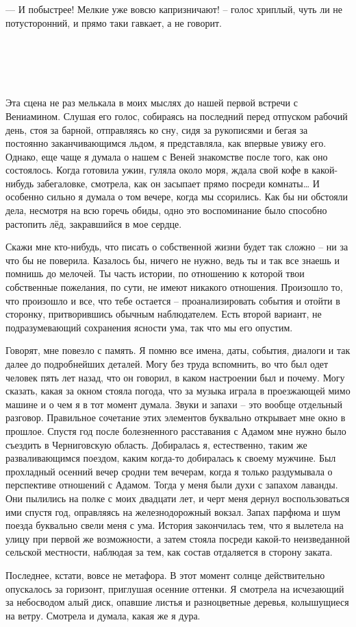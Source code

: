 \documentclass[
]{book}
\begin{document}
--- И побыстрее! Мелкие уже вовсю капризничают! -- голос хриплый, чуть ли не потусторонний, и прямо таки гавкает, а не говорит.

\hypertarget{section-3}{%
\chapter{~}\label{section-3}}

Эта сцена не раз мелькала в моих мыслях до нашей первой встречи с Вениамином. Слушая его голос, собираясь на последний перед отпуском рабочий день, стоя за барной, отправляясь ко сну, сидя за рукописями и бегая за постоянно заканчивающимся льдом, я представляла, как впервые увижу его. Однако, еще чаще я думала о нашем с Веней знакомстве после того, как оно состоялось. Когда готовила ужин, гуляла около моря, ждала свой кофе в какой-нибудь забегаловке, смотрела, как он засыпает прямо посреди комнаты\ldots{} И особенно сильно я думала о том вечере, когда мы ссорились. Как бы ни обстояли дела, несмотря на всю горечь обиды, одно это воспоминание было способно растопить лёд, закравшийся в мое сердце.

Скажи мне кто-нибудь, что писать о собственной жизни будет так сложно -- ни за что бы не поверила. Казалось бы, ничего не нужно, ведь ты и так все знаешь и помнишь до мелочей. Ты часть истории, по отношению к которой твои собственные пожелания, по сути, не имеют никакого отношения. Произошло то, что произошло и все, что тебе остается -- проанализировать события и отойти в сторонку, притворившись обычным наблюдателем. Есть второй вариант, не подразумевающий сохранения ясности ума, так что мы его опустим.

Говорят, мне повезло с память. Я помню все имена, даты, события, диалоги и так далее до подробнейших деталей. Могу без труда вспомнить, во что был одет человек пять лет назад, что он говорил, в каком настроении был и почему. Могу сказать, какая за окном стояла погода, что за музыка играла в проезжающей мимо машине и о чем я в тот момент думала. Звуки и запахи -- это вообще отдельный разговор. Правильное сочетание этих элементов буквально открывает мне окно в прошлое. Спустя год после болезненного расставания с Адамом мне нужно было съездить в Черниговскую область. Добиралась я, естественно, таким же разваливающимся поездом, каким когда-то добиралась к своему мужчине. Был прохладный осенний вечер сродни тем вечерам, когда я только раздумывала о перспективе отношений с Адамом. Тогда у меня были духи с запахом лаванды. Они пылились на полке с моих двадцати лет, и черт меня дернул воспользоваться ими спустя год, оправляясь на железнодорожный вокзал. Запах парфюма и шум поезда буквально свели меня с ума. История закончилась тем, что я вылетела на улицу при первой же возможности, а затем стояла посреди какой-то неизведанной сельской местности, наблюдая за тем, как состав отдаляется в сторону заката.

Последнее, кстати, вовсе не метафора. В этот момент солнце действительно опускалось за горизонт, приглушая осенние оттенки. Я смотрела на исчезающий за небосводом алый диск, опавшие листья и разноцветные деревья, колышущиеся на ветру. Смотрела и думала, какая же я дура.
\end{document}
